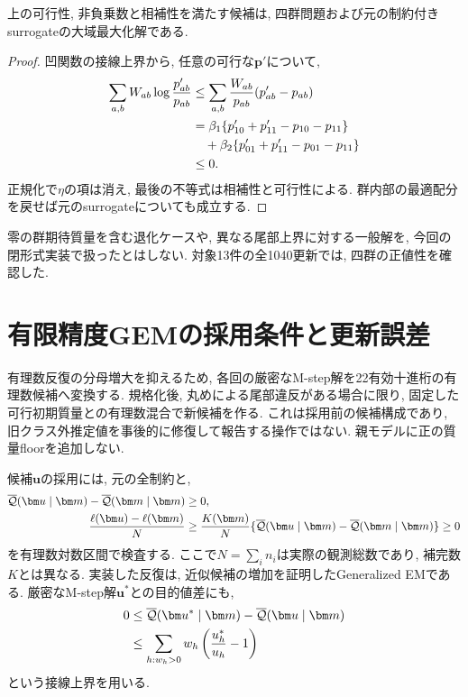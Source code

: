 \begin{proposition}
\label{prop:stage24_mstep_optimality}
上の可行性, 非負乗数と相補性を満たす候補は,
四群問題および元の制約付きsurrogateの大域最大化解である.
\end{proposition}
\begin{proof}
凹関数の接線上界から, 任意の可行な$\bm p'$について,
\begin{align}
\sum_{a,b}W_{ab}\log\frac{p'_{ab}}{p_{ab}}
&\le\sum_{a,b}\frac{W_{ab}}{p_{ab}}(p'_{ab}-p_{ab})\notag\\
&=\beta_1\{p'_{10}+p'_{11}-p_{10}-p_{11}\}\notag\\
&\quad+\beta_2\{p'_{01}+p'_{11}-p_{01}-p_{11}\}\notag\\
&\le0.
\label{eq:stage24_mstep_proof}
\end{align}
正規化で$\eta$の項は消え, 最後の不等式は相補性と可行性による.
群内部の最適配分を戻せば元のsurrogateについても成立する.
\end{proof}

零の群期待質量を含む退化ケースや, 異なる尾部上界に対する一般解を,
今回の閉形式実装で扱ったとはしない.
対象13件の全1040更新では, 四群の正値性を確認した.

\section{有限精度GEMの採用条件と更新誤差}
\label{sec:stage24_finite_precision}

有理数反復の分母増大を抑えるため,
各回の厳密なM-step解を22有効十進桁の有理数候補へ変換する.
規格化後, 丸めによる尾部違反がある場合に限り,
固定した可行初期質量との有理数混合で新候補を作る.
これは採用前の候補構成であり,
旧クラス外推定値を事後的に修復して報告する操作ではない.
親モデルに正の質量floorを追加しない.

候補$\bm u$の採用には, 元の全制約と,
\begin{align}
\overline{\mathcal Q}(\bm u\mid\bm m)
-\overline{\mathcal Q}(\bm m\mid\bm m)&\ge0,\notag\\
\frac{\ell(\bm u)-\ell(\bm m)}{N}
&\ge\frac{K(\bm m)}N
\{\overline{\mathcal Q}(\bm u\mid\bm m)
-\overline{\mathcal Q}(\bm m\mid\bm m)\}\ge0
\label{eq:stage24_acceptance}
\end{align}
を有理数対数区間で検査する.
ここで$N=\sum_i n_i$は実際の観測総数であり, 補完数$K$とは異なる.
実装した反復は, 近似候補の増加を証明したGeneralized EMである.
厳密なM-step解$\bm u^*$との目的値差にも,
\begin{align}
0&\le\overline{\mathcal Q}(\bm u^*\mid\bm m)
-\overline{\mathcal Q}(\bm u\mid\bm m)\notag\\
&\le\sum_{h:w_h>0}w_h\left(\frac{u_h^*}{u_h}-1\right)
\label{eq:stage24_mstep_error}
\end{align}
という接線上界を用いる.

